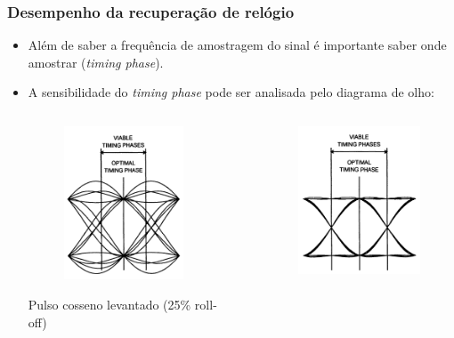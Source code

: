 \begin{frame}
	\frametitle{Desempenho da recuperação de relógio}
	
	\begin{itemize}
		\item Além de saber a frequência de amostragem do sinal é importante saber onde amostrar (\textit{timing phase}).
		\item A sensibilidade do \textit{timing phase} pode ser analisada pelo diagrama de olho:
		
		\begin{columns}
			\begin{column}{.5\columnwidth}
				\begin{figure}
					\centering
					\includegraphics[width=.48\textwidth]{figs/olho_timing_phase_25}
				\end{figure}
			\begin{footnotesize} Pulso cosseno levantado (25\% roll-off) \end{footnotesize}
			\vspace{0.2cm}
			\end{column}
		~
		\begin{column}{.5\columnwidth}
			\begin{figure}
				\centering
				\includegraphics[width=.48\textwidth]{figs/olho_timing_phase_100}
				

\end{figure}
\end{column}
\end{columns}
\end{itemize}
\end{frame}

